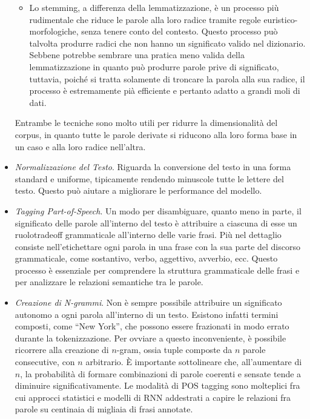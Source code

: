\documentclass[12pt,a4paper,twoside,openright]{book}
\begin{document}
\begin{itemize}
\begin{itemize}
        \item Lo stemming, a differenza della lemmatizzazione, è un processo più rudimentale che riduce le parole alla loro radice tramite regole euristico-morfologiche, senza tenere conto del contesto. Questo processo può talvolta produrre radici che non hanno un significato valido nel dizionario. 
        Sebbene potrebbe sembrare una pratica meno valida della lemmatizzazione in quanto può produrre parole prive di significato, tuttavia, poiché si tratta solamente di troncare la parola alla sua radice, il processo è estremamente pià efficiente e pertanto adatto a grandi moli di dati.
    \end{itemize}
    Entrambe le tecniche sono molto utili per ridurre la dimensionalità del corpus, in quanto tutte le parole derivate si riducono alla loro forma base in un caso e alla loro radice nell'altra.
    \item \emph{Normalizzazione del Testo}. Riguarda la conversione del testo in una forma standard e uniforme, tipicamente rendendo minuscole tutte le lettere del testo. Questo può aiutare a migliorare le performance del modello.
    \item \emph{Tagging Part-of-Speech}. Un modo per disambiguare, quanto meno in parte, il significato delle parole all'interno del testo è attribuire a ciascuna di esse un ruolotradeoff grammaticale all'interno delle varie frasi. Più nel dettaglio consiste nell'etichettare ogni parola in una frase con la sua parte del discorso grammaticale, come sostantivo, verbo, aggettivo, avverbio, ecc. Questo processo è essenziale per comprendere la struttura grammaticale delle frasi e per analizzare le relazioni semantiche tra le parole.
    \item \emph{Creazione di N-grammi}. Non è sempre possibile attribuire un significato autonomo a ogni parola all'interno di un testo. Esistono infatti termini composti, come ``New York'', che possono essere frazionati in modo errato durante la tokenizzazione. Per ovviare a questo inconveniente, è possibile ricorrere alla creazione di $n$-gram, ossia tuple composte da $n$ parole consecutive, con $n$ arbitrario. È importante sottolineare che, all'aumentare di $n$, la probabilità di formare combinazioni di parole coerenti e sensate tende a diminuire significativamente.
    Le modalità di POS tagging sono molteplici fra cui approcci statistici e modelli di RNN addestrati a capire le relazioni fra parole su centinaia di migliaia di frasi annotate.

\end{itemize}
\end{document}
